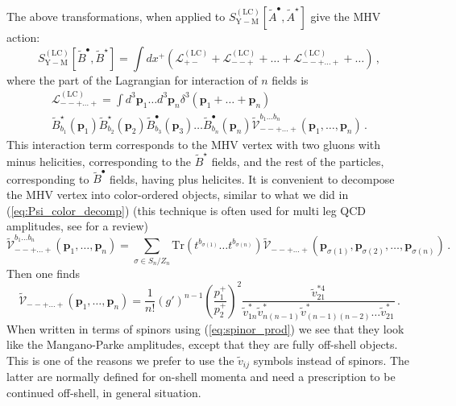 \documentclass[english,american]{article}
\begin{document}
The above transformations, when applied to $S_{\mathrm{Y-M}}^{\left(\mathrm{LC}\right)}\left[\tilde{A}^{\bullet},\tilde{A}^{\star}\right]$
give the MHV action:
\begin{equation}
S_{\mathrm{Y-M}}^{\left(\mathrm{LC}\right)}\left[\tilde{B}^{\bullet},\tilde{B}^{\star}\right]=\int dx^{+}\left(\mathcal{L}_{+-}^{\left(\mathrm{LC}\right)}+\mathcal{L}_{--+}^{\left(\mathrm{LC}\right)}+\dots+\mathcal{L}_{--+\dots+}^{\left(\mathrm{LC}\right)}+\dots\right)\,,\label{eq:MHV_action}
\end{equation}
where the part of the Lagrangian for interaction of $n$ fields is
\begin{multline}
\mathcal{L}_{--+\dots+}^{\left(\mathrm{LC}\right)}=\int d^{3}\mathbf{p}_{1}\dots d^{3}\mathbf{p}_{n}\delta^{3}\left(\mathbf{p}_{1}+\dots+\mathbf{p}_{n}\right)\\ \tilde{B}_{b_{1}}^{\star}\left(\mathbf{p}_{1}\right)\tilde{B}_{b_{2}}^{\star}\left(\mathbf{p}_{2}\right)\tilde{B}_{b_{3}}^{\bullet}\left(\mathbf{p}_{3}\right)\dots\tilde{B}_{b_{n}}^{\bullet}\left(\mathbf{p}_{n}\right)\tilde{\mathcal{V}}_{--+\dots+}^{b_{1}\dots b_{n}}\left(\mathbf{p}_{1},\dots,\mathbf{p}_{n}\right)\,.\label{eq:MHV_n_point}
\end{multline}
This interaction term corresponds to the MHV vertex with  two gluons with minus helicities, corresponding to the  $\tilde{B}^{\star}$ fields, and the rest of the particles, corresponding to $\tilde{B}^{\bullet}$ fields,  having plus helicites.
It is convenient to decompose the MHV vertex into color-ordered objects,
similar to what we did in (\ref{eq:Psi_color_decomp}) (this technique
is often used for multi leg QCD amplitudes, see \citep{Mangano:1990by}
for a review)
\begin{equation}
\tilde{\mathcal{V}}_{--+\dots+}^{b_{1}\dots b_{n}}\left(\mathbf{p}_{1},\dots,\mathbf{p}_{n}\right)=\sum_{\sigma\in S_{n}/Z_{n}}\mathrm{Tr}\left(t^{b_{\sigma\left(1\right)}}\dots t^{b_{\sigma\left(n\right)}}\right)\tilde{\mathcal{V}}_{--+\dots+}\left(\mathbf{p}_{\sigma\left(1\right)},\mathbf{p}_{\sigma\left(2\right)},\dots,\mathbf{p}_{\sigma\left(n\right)}\right)\,.\label{eq:MHV_color}
\end{equation}
Then one finds 
\begin{equation}
\tilde{\mathcal{V}}_{--+\dots+}\left(\mathbf{p}_{1},\dots,\mathbf{p}_{n}\right)=\frac{1}{n!}\left(g'\right)^{n-1}\left(\frac{p_{1}^{+}}{p_{2}^{+}}\right)^{2}\frac{\tilde{v}_{21}^{*4}}{\tilde{v}_{1n}^{*}\tilde{v}_{n\left(n-1\right)}^{*}\tilde{v}_{\left(n-1\right)\left(n-2\right)}^{*}\dots\tilde{v}_{21}^{*}}\,.\label{eq:MHV_vertex_colororder}
\end{equation}
When written in terms of spinors using (\ref{eq:spinor_prod}) we
see that they look like the Mangano-Parke amplitudes, except that
they are fully off-shell objects. This is one of the reasons we prefer
to use the $\tilde{v}_{ij}$ symbols instead of spinors. The latter
are normally defined for on-shell momenta and need a prescription
to be continued off-shell, in general situation.
\end{document}

